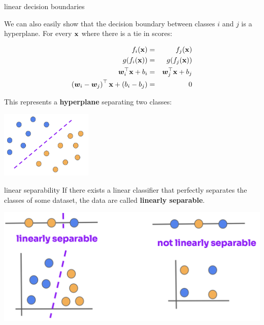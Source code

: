 \documentclass[11pt,compress,t,notes=noshow, xcolor=table]{beamer}
\begin{document}
\begin{vbframe}{linear decision boundaries}
  
We can also easily show that the decision boundary between classes $i$ and $j$ is a hyperplane. For every $\xv$ where there is a tie in scores: 

\begin{eqnarray*}
  \fkx[i] &=& \fkx[j] \\
  g(\fkx[i]) &=& g(\fkx[j]) \\
  \bm{w}_i^\top \xv + b_i &=& \bm{w}_j^\top \xv + b_j \\
  \left(\bm{w}_i - \bm{w}_j\right)^\top \xv + \left(b_i - b_j\right) &=& 0 
\end{eqnarray*}

This represents a \textbf{hyperplane} separating two classes:

\begin{center}
\includegraphics[width=0.33\textwidth]{figure_man/linear-boundary.png} 
\end{center}
  

\end{vbframe}

\begin{vbframe}{linear separability}
If there exists a linear classifier that perfectly separates the classes of some dataset, the data are called \textbf{linearly separable}.

\vspace{1cm}

\begin{center}
\includegraphics{figure_man/linear_separability-2.png} 
\end{center}

\end{vbframe}
\end{document}
